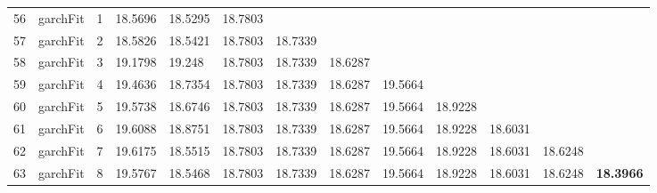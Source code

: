 \documentclass[10pt,a4paper]{article}
\begin{document}
\begin{table}[ht]
\begin{tabular}{rlrllllllllll}
  56 & garchFit &     1 & 18.5696 & 18.5295 & 18.7803 &  &  &  &  &  &  &  \\ 
  57 & garchFit &     2 & 18.5826 & 18.5421 & 18.7803 & 18.7339 &  &  &  &  &  &  \\ 
  58 & garchFit &     3 & 19.1798 & 19.248 & 18.7803 & 18.7339 & 18.6287 &  &  &  &  &  \\ 
  59 & garchFit &     4 & 19.4636 & 18.7354 & 18.7803 & 18.7339 & 18.6287 & 19.5664 &  &  &  &  \\ 
  60 & garchFit &     5 & 19.5738 & 18.6746 & 18.7803 & 18.7339 & 18.6287 & 19.5664 & 18.9228 &  &  &  \\ 
  61 & garchFit &     6 & 19.6088 & 18.8751 & 18.7803 & 18.7339 & 18.6287 & 19.5664 & 18.9228 & 18.6031 &  &  \\ 
  62 & garchFit &     7 & 19.6175 & 18.5515 & 18.7803 & 18.7339 & 18.6287 & 19.5664 & 18.9228 & 18.6031 & 18.6248 &  \\ 
  63 & garchFit &     8 & 19.5767 & 18.5468 & 18.7803 & 18.7339 & 18.6287 & 19.5664 & 18.9228 & 18.6031 & 18.6248 & \textbf{18.3966} \\ 
   \hline
\end{tabular}
\end{table}
\end{document}
